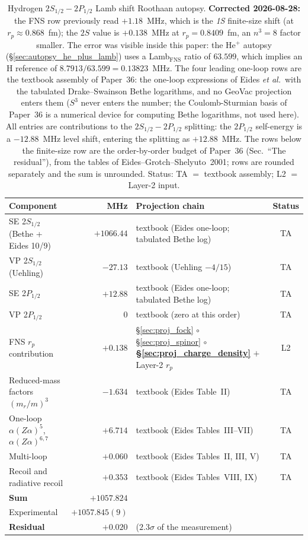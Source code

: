 \documentclass[11pt]{article}
\begin{document}
\begin{table}[h]
\centering\small
\begin{tabular}{p{4cm} r p{6cm} c}
\toprule
Component & MHz & Projection chain & Status \\
\midrule
SE 2$S_{1/2}$ (Bethe + Eides 10/9) & $+1066.44$ &
textbook (Eides one-loop; tabulated Bethe log) & TA \\
VP 2$S_{1/2}$ (Uehling) & $-27.13$ &
textbook (Uehling $-4/15$) & TA \\
SE 2$P_{1/2}$ & $+12.88$ &
textbook (Eides one-loop; tabulated Bethe log) & TA \\
VP 2$P_{1/2}$ & $0$ &
textbook (zero at this order) & TA \\
FNS $r_p$ contribution & $+0.138$ &
\S\ref{sec:proj_fock} $\circ$ \S\ref{sec:proj_spinor} $\circ$
\textbf{\S\ref{sec:proj_charge_density}} $+$ Layer-2 $r_p$ & L2 \\
Reduced-mass factors $(m_r/m)^3$ & $-1.634$ &
textbook (Eides Table~II) & TA \\
One-loop $\alpha(Z\alpha)^5$, $\alpha(Z\alpha)^{6,7}$ & $+6.714$ &
textbook (Eides Tables~III--VII) & TA \\
Multi-loop & $+0.060$ & textbook (Eides Tables~II, III, V) & TA \\
Recoil and radiative recoil & $+0.353$ & textbook (Eides Tables~VIII, IX) & TA \\
\midrule
\textbf{Sum} & $+1057.824$ & & \\
Experimental & $+1057.845(9)$ & & \\
\textbf{Residual} & $+0.020$ & ($2.3\sigma$ of the measurement) & \\
\bottomrule
\end{tabular}
\caption{Hydrogen $2S_{1/2}-2P_{1/2}$ Lamb shift Roothaan autopsy.
\textbf{Corrected 2026-08-28:} the FNS row previously read $+1.18$~MHz,
which is the \emph{1S} finite-size shift (at $r_p \approx 0.868$~fm); the
$2S$ value is $+0.138$~MHz at $r_p = 0.8409$~fm, an $n^3 = 8$ factor
smaller.  The error was visible inside this paper: the He$^+$ autopsy
(\S\ref{sec:autopsy_he_plus_lamb}) uses a Lamb$_\text{FNS}$ ratio of
$63.599$, which implies an H reference of $8.7913/63.599 = 0.13823$~MHz.
The four leading one-loop rows are the textbook assembly of Paper~36:
the one-loop expressions of Eides \emph{et al.}\ with the tabulated
Drake--Swainson Bethe logarithms, and no GeoVac projection enters them
($S^3$ never enters the number; the Coulomb-Sturmian basis of Paper~36
is a numerical device for computing Bethe logarithms, not used here).
All entries are
contributions to the $2S_{1/2}-2P_{1/2}$ splitting: the $2P_{1/2}$
self-energy is a $-12.88$~MHz level shift, entering the splitting as
$+12.88$~MHz.  The rows below the finite-size row are the order-by-order
budget of Paper~36 (Sec.~``The residual''), from the tables of
Eides--Grotch--Shelyuto~2001; rows are rounded separately and the sum is
unrounded.
Status: TA $=$ textbook assembly; L2 $=$ Layer-2 input.}
\label{tab:autopsy_lamb}
\end{table}
\end{document}
